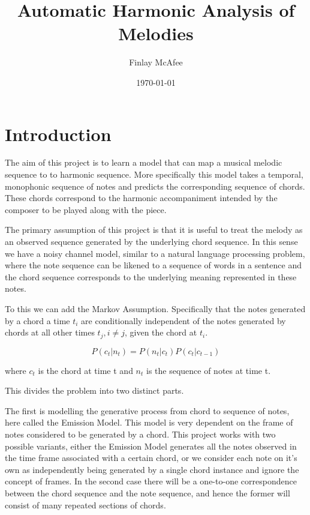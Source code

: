 \documentclass[bsc,logo,twoside,singlespacing,parskip,deptreport]{infthesis}
\begin{document}
\title{Automatic Harmonic Analysis of Melodies}

\author{Finlay McAfee}


\date{\today}

\maketitle



\chapter{Introduction}
The aim of this project is to learn a model that can map a musical melodic sequence to to harmonic sequence. More specifically this model takes a temporal, monophonic sequence of notes and predicts the corresponding sequence of chords. These chords correspond to the harmonic accompaniment intended by the composer to be played along with the piece.

The primary assumption of this project is that it is useful to treat the melody as an observed sequence generated by the underlying chord sequence. In this sense we have a noisy channel model, similar to a natural language processing problem, where the note sequence can be likened to a sequence of words in a sentence and the chord sequence corresponds to the underlying meaning represented in these notes.

To this we can add the Markov Assumption. Specifically that the notes generated by a chord a time $t_i$ are conditionally independent of the notes generated by chords at all other times $t_j, i \neq j$, given the chord at $t_i$.

\begin{equation} \label{eq1}
P(c_t | n_t) = P(n_t | c_t) P(c_t | c_{t-1})
\end{equation}

where $c_t$ is the chord at time t and $n_t$ is the sequence of notes at time t.

This divides the problem into two distinct parts.

The first is modelling the generative process from chord to sequence of notes, here called the Emission Model. This model is very dependent on the frame of notes considered to be generated by a chord. This project works with two possible variants, either the Emission Model generates all the notes observed in the time frame associated with a certain chord, or we consider each note on it's own as independently being generated by a single chord instance and ignore the concept of frames. In the second case there will be a one-to-one correspondence between the chord sequence and the note sequence, and hence the former will consist of many repeated sections of chords.
\end{document}
